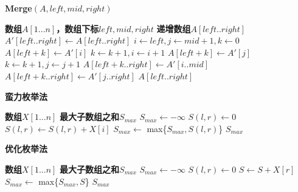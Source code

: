 \documentclass{article}
\begin{document}
\begin{CJK}{UTF8}{gbsn}
        \begin{algorithm}
            \caption{\textbf{Merge$(A,left,mid,right)$}}
            \begin{algorithmic}[1]
                \Require \textbf{数组$A[1...n]$，数组下标$left,mid,right$}
                \Ensure \textbf{递增数组$A[left..right]$}
                \State $A'[left..right] \leftarrow A[left..right]$
                \State $i \leftarrow left, j \leftarrow mid+1,k \leftarrow 0$
                        \State $A[left+k] \leftarrow A'[i]$
                        \State $k \leftarrow k+1, i \leftarrow i+1$
                    \Else
                        \State $A[left+k] \leftarrow A'[j]$
                        \State $k \leftarrow k+1, j \leftarrow j+1$
                    \EndIf
                \EndWhile
                    \State $A[left+k..right] \leftarrow A'[i..mid]$
                \Else
                    \State $A[left+k..right] \leftarrow A'[j..right]$
                \EndIf
                \State \Return $A[left..right]$
            \end{algorithmic}
        \end{algorithm}

    \begin{algorithm}
            \caption{\textbf{蛮力枚举法}}
            \begin{algorithmic}[1]
                \Require \textbf{数组$X[1...n]$}
                \Ensure \textbf{最大子数组之和$S_{max}$}
                \State $S_{max} \leftarrow -\infty$
                        \State $S(l,r) \leftarrow 0$
                            \State $S(l,r) \leftarrow S(l,r)+X[i]$
                        \EndFor
                        \State $S_{max} \leftarrow$ max\{$S_{max},S(l,r)$\}
                    \EndFor
                \EndFor
                \State \Return $S_{max}$
        \end{algorithmic}
    \end{algorithm}

    \begin{algorithm}
        \caption{\textbf{优化枚举法}}
        \begin{algorithmic}[1]
            \Require \textbf{数组$X[1...n]$}
            \Ensure \textbf{最大子数组之和$S_{max}$}
            \State $S_{max} \leftarrow -\infty$
                \State $S(l,r) \leftarrow 0$
                    \State $S \leftarrow S+X[r]$
                    \State $S_{max} \leftarrow$ max\{$S_{max},S$\}
                \EndFor
            \EndFor
            \State \Return $S_{max}$
        \end{algorithmic}
    \end{algorithm}


\end{CJK}
\end{document}
